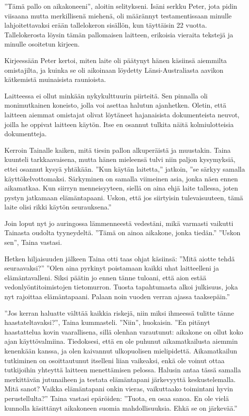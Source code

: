 ﻿\documentclass[a4paper, 12pt, finnish]{article}
\newcommand{\q}[1]{''#1''}  %
\begin{document}
\q{Tämä pallo on aikakoneeni}, aloitin selitykseni.
Isäni serkku Peter, jota pidin viisaana mutta merkillisenä
miehenä, oli määrännyt testamentissaan minulle
lahjoitettavaksi erään tallelokeron sisällön,
kun täyttäisin 22 vuotta. Tallelokerosta
löysin tämän pallomaisen laitteen, erikoisia vieraita tekstejä
ja minulle osoitetun kirjeen.

Kirjeessään Peter kertoi, miten laite oli päätynyt hänen käsiinsä
aiemmilta omistajilta, ja kuinka se oli aikoinaan löydetty
Länsi-Australiasta aavikon kätkemistä muinaisista raunioista.

Laitteessa ei ollut minkään nykykulttuurin piirteitä.
Sen pinnalla oli monimutkainen koneisto,
jolla voi asettaa halutun ajanhetken. Oletin,
että laitteen aiemmat omistajat olivat löytäneet hajanaisista
dokumenteista neuvot, joilla he oppivat laitteen käytön.
Itse en osannut tulkita näitä kolmiulotteisia dokumentteja.

Kerroin Tainalle kaiken, mitä tiesin pallon alkuperäistä ja muustakin.
Taina kuunteli tarkkaavaisena, mutta hänen mieleensä tulvi niin paljon
kysymyksiä, ettei osannut kysyä yhtäkään.
\q{Kun käytän laitetta,} jatkoin, \q{se särkyy samalla käyttökelvottomaksi.
Särkyminen on samalla viimeinen asia, jonka näen ennen aikamatkaa.
Kun siirryn menneisyyteen, siellä on aina ehjä laite tallessa,
joten pystyn jatkamaan elämäntapaani. Uskon, että jos siirtyisin
tulevaisuuteen, tämä laite olisi rikki käytön seurauksena.}

Join loput nyt jo auringossa lämmenneestä vedestäni,
mikä varmasti vaikutti Tainasta oudolta tyyneydeltä.
\q{Tämä on ainoa aikakone, jonka tiedän.}
\q{Uskon sen}, Taina vastasi.

Hetken hiljaisuuden jälkeen Taina otti taas ohjat käsiinsä:
\q{Mitä aiotte tehdä seuraavaksi?}
\q{Olen aina pyrkinyt poistamaan kaikki uhat laitteelleni
ja elämäntavalleni. Siksi päätin jo ennen tänne tuloani, että
aion estää vedonlyöntitoimistojen tietomurron. Tuosta
tapahtumasta alkoi julkisuus, joka nyt rajoittaa elämäntapaani.
Palaan noin vuoden verran ajassa taaksepäin.}

\q{Jos kerran haluatte välttää kaikkia riskejä, niin miksi
ihmeessä tulitte tänne haastateltavaksi?}, Taina kummasteli.
\q{Niin}, huokaisin. \q{En pitänyt haastattelua kovin vaarallisena,
sillä olenhan varautunut: aikakone on ollut koko ajan käyttövalmiina.
Tiedoksesi, että en ole puhunut aikamatkailusta aiemmin 
kenenkään kanssa, ja olen kaivannut ulkopuolisen mielipidettä.
Aikamatkailun tutkiminen on osoittautunut itselleni
liian vaikeaksi, enkä ole voinut ottaa tutkijoihin
yhteyttä laitteen menettämisen pelossa.
Halusin antaa tässä samalla merkittävän jutunaiheen ja
testata elämäntapani järkevyyttä keskustelemalla.
Mitä sanot? Vaikka elämäntapani onkin vieras,
vaikuttaako toimintani hyvin perustellulta?}
Taina vastasi epäröiden: \q{Tuota, en osaa sanoa.
En ole vielä kunnolla käsittänyt aikakoneen suomia
mahdollisuuksia. Ehkä se on järkevää.}
 
\end{document}
